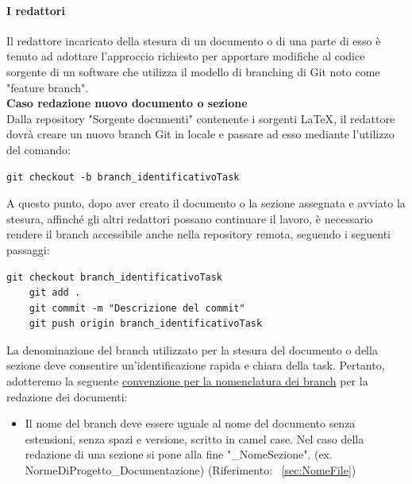 \documentclass{article}
\begin{document}
    

    \paragraph{I redattori}

    Il redattore incaricato della stesura di un documento o di una parte di esso è tenuto ad adottare l'approccio richiesto per apportare modifiche al codice sorgente di un software che utilizza il modello di branching di Git noto come "feature branch".\\
    \vspace{0.1cm}
    \textbf{Caso redazione nuovo documento o sezione}\\
Dalla repository  "Sorgente documenti" contenente i sorgenti \LaTeX, il redattore dovrà creare un nuovo branch Git in locale e passare ad esso mediante l'utilizzo del comando:

    \begin{lstlisting}[style=code]
    git checkout -b branch_identificativoTask 
    \end{lstlisting}

    A questo punto, dopo aver creato il documento o la sezione assegnata e avviato la stesura, affinché gli altri redattori possano continuare il lavoro, è necessario rendere il branch accessibile anche nella repository remota, seguendo i seguenti passaggi:        
        \begin{lstlisting}[style=code]
    git checkout branch_identificativoTask 
    git add .
    git commit -m "Descrizione del commit"
    git push origin branch_identificativoTask
        \end{lstlisting}
    La denominazione del branch utilizzato per la stesura del documento o della sezione deve consentire un'identificazione rapida e chiara della task. Pertanto, adotteremo la seguente \underline{convenzione per la nomenclatura dei branch} per la redazione dei documenti:
    \begin{itemize}
        \item     Il nome del branch deve essere uguale al nome del documento senza estensioni, senza spazi e versione, scritto in camel case. Nel caso della redazione di una sezione si pone alla fine "\_NomeSezione". (ex. NormeDiProgetto\_Documentazione) (Riferimento: ~\ref{sec:NomeFile})
    \end{itemize}
\end{document}
